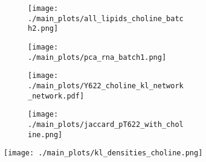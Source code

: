 \begin{figure}[ht]
    \begin{subfigure}[t]{.2\textwidth}
        \begin{subfigure}[t]{\textwidth}
            \caption{}
            \texttt{[image: ./main\_plots/all\_lipids\_choline\_batch2.png]}        
        \end{subfigure} 
        \begin{subfigure}[t]{\textwidth}
            \caption{}
            \texttt{[image: ./main\_plots/pca\_rna\_batch1.png]}        
        \end{subfigure}  
    \end{subfigure}  
    \begin{subfigure}[t]{.225\textwidth}
        \begin{subfigure}[t]{\textwidth}
            \caption{}
            \texttt{[image: ./main\_plots/Y622\_choline\_kl\_network\_network.pdf]}        
        \end{subfigure}  
        \begin{subfigure}[t]{\textwidth}
            \caption{}
            \texttt{[image: ./main\_plots/jaccard\_pT622\_with\_choline.png]}        
        \end{subfigure} 
    \end{subfigure} 
    \begin{subfigure}[t]{.5\textwidth}
        \caption{}
        \texttt{[image: ./main\_plots/kl\_densities\_choline.png]}        
    \end{subfigure}  
    


\end{figure}
